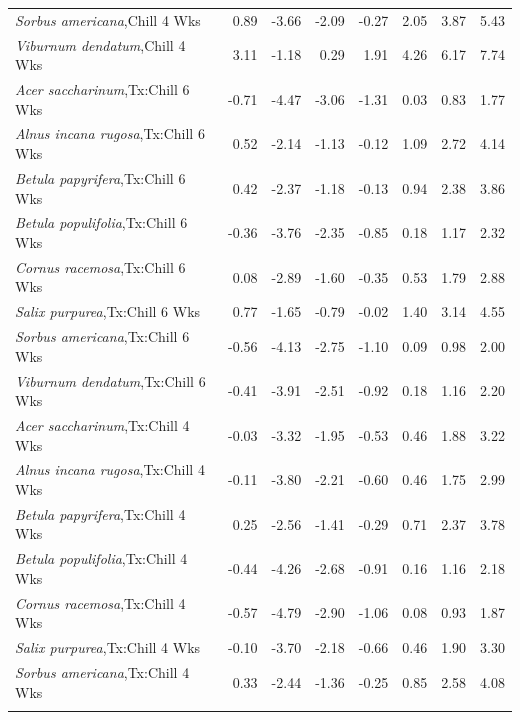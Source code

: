 \documentclass{article}\usepackage[]{graphicx}\usepackage[]{color}
\begin{document}
\begin{longtable}{lrrrrrrr}
  \textit{Sorbus americana},Chill 4 Wks & 0.89 & -3.66 & -2.09 & -0.27 & 2.05 & 3.87 & 5.43 \\ 
  \textit{Viburnum dendatum},Chill 4 Wks & 3.11 & -1.18 & 0.29 & 1.91 & 4.26 & 6.17 & 7.74 \\ 
  \textit{Acer saccharinum},Tx:Chill 6 Wks & -0.71 & -4.47 & -3.06 & -1.31 & 0.03 & 0.83 & 1.77 \\ 
  \textit{Alnus incana rugosa},Tx:Chill 6 Wks & 0.52 & -2.14 & -1.13 & -0.12 & 1.09 & 2.72 & 4.14 \\ 
  \textit{Betula papyrifera},Tx:Chill 6 Wks & 0.42 & -2.37 & -1.18 & -0.13 & 0.94 & 2.38 & 3.86 \\ 
  \textit{Betula populifolia},Tx:Chill 6 Wks & -0.36 & -3.76 & -2.35 & -0.85 & 0.18 & 1.17 & 2.32 \\ 
  \textit{Cornus racemosa},Tx:Chill 6 Wks & 0.08 & -2.89 & -1.60 & -0.35 & 0.53 & 1.79 & 2.88 \\ 
  \textit{Salix purpurea},Tx:Chill 6 Wks & 0.77 & -1.65 & -0.79 & -0.02 & 1.40 & 3.14 & 4.55 \\ 
  \textit{Sorbus americana},Tx:Chill 6 Wks & -0.56 & -4.13 & -2.75 & -1.10 & 0.09 & 0.98 & 2.00 \\ 
  \textit{Viburnum dendatum},Tx:Chill 6 Wks & -0.41 & -3.91 & -2.51 & -0.92 & 0.18 & 1.16 & 2.20 \\ 
  \textit{Acer saccharinum},Tx:Chill 4 Wks & -0.03 & -3.32 & -1.95 & -0.53 & 0.46 & 1.88 & 3.22 \\ 
  \textit{Alnus incana rugosa},Tx:Chill 4 Wks & -0.11 & -3.80 & -2.21 & -0.60 & 0.46 & 1.75 & 2.99 \\ 
  \textit{Betula papyrifera},Tx:Chill 4 Wks & 0.25 & -2.56 & -1.41 & -0.29 & 0.71 & 2.37 & 3.78 \\ 
  \textit{Betula populifolia},Tx:Chill 4 Wks & -0.44 & -4.26 & -2.68 & -0.91 & 0.16 & 1.16 & 2.18 \\ 
  \textit{Cornus racemosa},Tx:Chill 4 Wks & -0.57 & -4.79 & -2.90 & -1.06 & 0.08 & 0.93 & 1.87 \\ 
  \textit{Salix purpurea},Tx:Chill 4 Wks & -0.10 & -3.70 & -2.18 & -0.66 & 0.46 & 1.90 & 3.30 \\ 
  \textit{Sorbus americana},Tx:Chill 4 Wks & 0.33 & -2.44 & -1.36 & -0.25 & 0.85 & 2.58 & 4.08 \\ 
   \hline
\hline
\label{tab:suppmoddvr}
\end{longtable}
\end{document}
